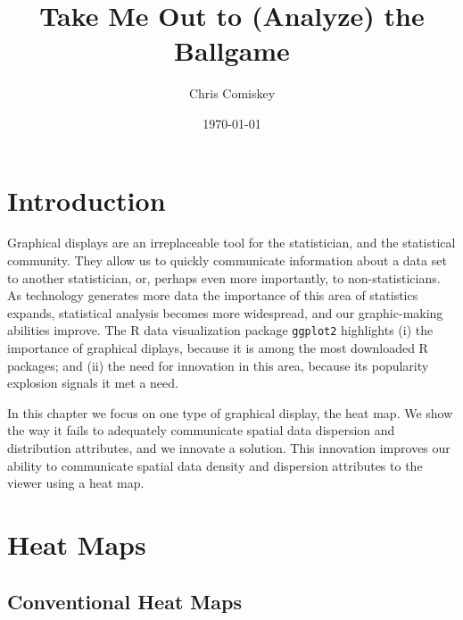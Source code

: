 \documentclass{article}
\title{Take Me Out to (Analyze) the Ballgame}
\author{Chris Comiskey}
\date{\today}
\begin{document}
\maketitle{}

\tableofcontents


\section{Introduction}
Graphical displays are an irreplaceable tool for the statistician, and the statistical community. They allow us to quickly communicate information about a data set to another statistician, or, perhaps even more importantly, to non-statisticians. As technology generates more data the importance of this area of statistics expands, statistical analysis becomes more widespread, and our graphic-making abilities improve. The R data visualization package \verb|ggplot2| highlights (i) the importance of graphical diplays, because it is among the most downloaded R packages; and (ii) the need for innovation in this area, because its popularity explosion signals it met a need.

In this chapter we focus on one type of graphical display, the heat map. We show the way it fails to adequately communicate spatial data dispersion and distribution attributes, and we innovate a solution. This innovation improves our ability to communicate spatial data density and dispersion attributes to the viewer using a heat map.

\section{Heat Maps} %


\subsection{Conventional Heat Maps} %
\end{document}
